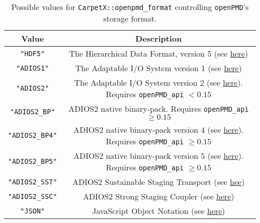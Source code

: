 \begin{table}[ht]
  \centering
  \begin{tabular}{cc}
    Value         & Description                                                                                                                                                                 \\ \hline\hline
    \texttt{"HDF5"}        & The Hierarchical Data Format, version 5 (see \href{https://www.hdfgroup.org/solutions/hdf5/}{here})                                                                \\
    \texttt{"ADIOS1"}      & The Adaptable I/O System version 1 (see \href{https://csmd.ornl.gov/software/adios-1x}{here})                                                                      \\
    \texttt{"ADIOS2"}      & The Adaptable I/O System version 2 (see \href{https://adios2.readthedocs.io/en/v2.9.2/}{here}). Requires \texttt{openPMD\_api} $< 0.15$                            \\
    \texttt{"ADIOS2\_BP"}  & ADIOS2 native binary-pack. Requires \texttt{openPMD\_api} $\geq0.15$                                                                                                   \\
    \texttt{"ADIOS2\_BP4"} & ADIOS2 native binary-pack version 4 (see \href{https://adios2.readthedocs.io/en/latest/engines/engines.html#bp5}{here}). Requires \texttt{openPMD\_api} $\geq0.15$ \\
    \texttt{"ADIOS2\_BP5"} & ADIOS2 native binary-pack version 5 (see \href{https://adios2.readthedocs.io/en/latest/engines/engines.html#bp5}{here}). Requires \texttt{openPMD\_api} $\geq0.15$ \\
    \texttt{"ADIOS2\_SST"} & ADIOS2 Sustainable Staging Transport (see \href{n ADIOS2, the Sustainable Staging Transport (SST)}{hee})                                                           \\
    \texttt{"ADIOS2\_SSC"} & ADIOS2 Strong Staging Coupler (see \href{Strong Staging Coupler}{here})                                                                                            \\
    \texttt{"JSON"}        & JavaScript Object Notation (see \href{https://www.json.org/json-en.html}{here})                                                                                    \\ \hline\hline
  \end{tabular}
  \label{tab:openpmd_formats}
  \caption{Possible values for \texttt{CarpetX::openpmd\_format} controlling \texttt{openPMD}'s storage format.}
\end{table}

